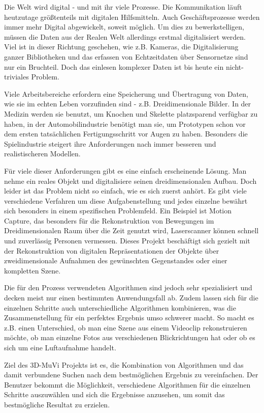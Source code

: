 Die Welt wird digital - und mit ihr viele Prozesse. Die Kommunikation läuft heutzutage größtenteils mit digitalen Hilfsmitteln. Auch Geschäftsprozesse werden immer mehr Digital abgewickelt, soweit möglich. Um dies zu bewerkstelligen, müssen die Daten aus der Realen Welt allerdings erstmal digitalisiert werden. Viel ist in dieser Richtung geschehen, wie z.B. Kameras, die Digitalisierung ganzer Bibliotheken und das erfassen von Echtzeitdaten über Sensornetze sind nur ein Bruchteil. Doch das einlesen komplexer Daten ist bis heute ein nicht-triviales Problem.

Viele Arbeitsbereiche erfordern eine Speicherung und Übertragung von Daten, wie sie im echten Leben vorzufinden sind - z.B. Dreidimensionale Bilder. In der Medizin werden sie benutzt, um Knochen und Skelette platzsparend verfügbar zu haben, in der Automobilindustrie benötigt man sie, um Prototypen schon vor dem ersten tatsächlichen Fertigungsschritt vor Augen zu haben. Besonders die Spielindustrie steigert ihre Anforderungen nach immer besseren und realistischeren Modellen.

Für viele dieser Anforderungen gibt es eine einfach erscheinende Lösung. Man nehme ein reales Objekt und digitalisiere seinen dreidimensionalen Aufbau. Doch leider ist das Problem nicht so einfach, wie es sich zuerst anhört. Es gibt viele verschiedene Verfahren um diese Aufgabenstellung und jedes einzelne bewährt sich besonders in einem spezifischen Problemfeld. Ein Beispiel ist Motion Capture, das besonders für die Rekonstruktion von Bewegungen im Dreidimensionalen Raum über die Zeit genutzt wird, Laserscanner können schnell und zuverlässig Personen vermessen. Dieses Projekt beschäftigt sich gezielt mit der Rekonstruktion von digitalen Repräsentationen der Objekte über zweidimensionale Aufnahmen des gewünschten Gegenstandes oder einer kompletten Szene.

Die für den Prozess verwendeten Algorithmen sind jedoch sehr spezialisiert und decken meist nur einen bestimmten Anwendungsfall ab. Zudem lassen sich für die einzelnen Schritte auch unterschiedliche Algorithmen kombinieren, was die Zusammenstellung für ein perfektes Ergebnis umso schwerer macht. So macht es z.B. einen Unterschied, ob man eine Szene aus einem Videoclip rekonstruieren möchte, ob man einzelne Fotos aus verschiedenen Blickrichtungen hat oder ob es sich um eine Luftaufnahme handelt.

Ziel des 3D-MuVi Projekts ist es, die Kombination von Algorithmen und das damit verbundene Suchen nach dem bestmöglichen Ergebnis zu vereinfachen. Der Benutzer bekommt die Möglichkeit, verschiedene Algorithmen für die einzelnen Schritte auszuwählen und sich die Ergebnisse anzusehen, um somit das bestmögliche Resultat zu erzielen.
